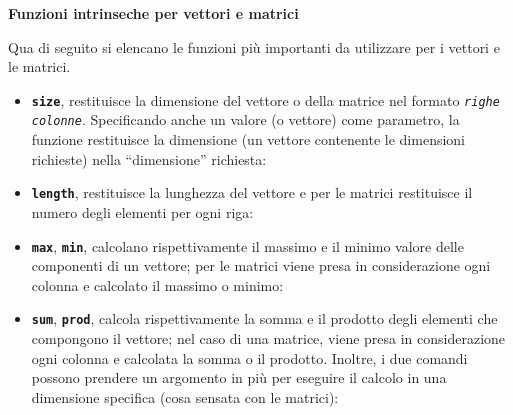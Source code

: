 \documentclass[a4paper]{article}
\newcommand{\dquotes}[1]{``#1''}
\begin{document}
    \begin{flushleft}
        \large
        \hypertarget{
            lab: Funzioni intrinseche per vettori e matrici
        }{
            \textcolor{Red3}{\textbf{Funzioni intrinseche per vettori e matrici}}
        }
        \label{lab: Funzioni intrinseche per vettori e matrici}
    \end{flushleft}
    Qua di seguito si elencano le funzioni più importanti da utilizzare per i vettori e le matrici.
    \begin{itemize}
        \item \texttt{\textbf{size}}, restituisce la dimensione del vettore o della matrice nel formato \texttt{\emph{righe} \emph{colonne}}. Specificando anche un valore (o vettore) come parametro, la funzione restituisce la dimensione (un vettore contenente le dimensioni richieste) nella \dquotes{dimensione} richiesta:
        

        \item \texttt{\textbf{length}}, restituisce la lunghezza del vettore e per le matrici restituisce il numero degli elementi per ogni riga:
        

        \item \texttt{\textbf{max}}, \texttt{\textbf{min}}, calcolano rispettivamente il massimo e il minimo valore delle componenti di un vettore; per le matrici viene presa in considerazione ogni colonna e calcolato il massimo o minimo:
        

        \item \texttt{\textbf{sum}}, \texttt{\textbf{prod}}, calcola rispettivamente la somma e il prodotto degli elementi che compongono il vettore; nel caso di una matrice, viene presa in considerazione ogni colonna e calcolata la somma o il prodotto. Inoltre, i due comandi possono prendere un argomento in più per eseguire il calcolo in una dimensione specifica (cosa sensata con le matrici):
        


\end{itemize}
\end{document}
